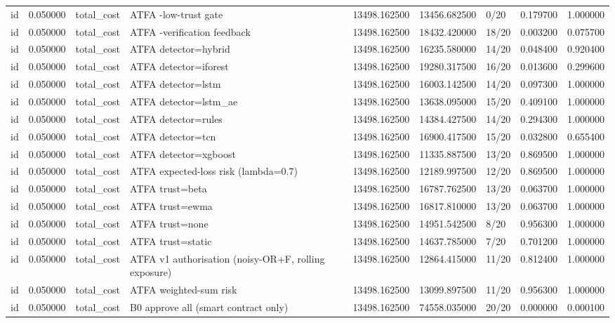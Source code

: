 \begin{tabular}{lrllrrlrr}
id & 0.050000 & total\_cost & ATFA -low-trust gate & 13498.162500 & 13456.682500 & 0/20 & 0.179700 & 1.000000 \\
id & 0.050000 & total\_cost & ATFA -verification feedback & 13498.162500 & 18432.420000 & 18/20 & 0.003200 & 0.075700 \\
id & 0.050000 & total\_cost & ATFA detector=hybrid & 13498.162500 & 16235.580000 & 14/20 & 0.048400 & 0.920400 \\
id & 0.050000 & total\_cost & ATFA detector=iforest & 13498.162500 & 19280.317500 & 16/20 & 0.013600 & 0.299600 \\
id & 0.050000 & total\_cost & ATFA detector=lstm & 13498.162500 & 16003.142500 & 14/20 & 0.097300 & 1.000000 \\
id & 0.050000 & total\_cost & ATFA detector=lstm\_ae & 13498.162500 & 13638.095000 & 15/20 & 0.409100 & 1.000000 \\
id & 0.050000 & total\_cost & ATFA detector=rules & 13498.162500 & 14384.427500 & 14/20 & 0.294300 & 1.000000 \\
id & 0.050000 & total\_cost & ATFA detector=tcn & 13498.162500 & 16900.417500 & 15/20 & 0.032800 & 0.655400 \\
id & 0.050000 & total\_cost & ATFA detector=xgboost & 13498.162500 & 11335.887500 & 13/20 & 0.869500 & 1.000000 \\
id & 0.050000 & total\_cost & ATFA expected-loss risk (lambda=0.7) & 13498.162500 & 12189.997500 & 12/20 & 0.869500 & 1.000000 \\
id & 0.050000 & total\_cost & ATFA trust=beta & 13498.162500 & 16787.762500 & 13/20 & 0.063700 & 1.000000 \\
id & 0.050000 & total\_cost & ATFA trust=ewma & 13498.162500 & 16817.810000 & 13/20 & 0.063700 & 1.000000 \\
id & 0.050000 & total\_cost & ATFA trust=none & 13498.162500 & 14951.542500 & 8/20 & 0.956300 & 1.000000 \\
id & 0.050000 & total\_cost & ATFA trust=static & 13498.162500 & 14637.785000 & 7/20 & 0.701200 & 1.000000 \\
id & 0.050000 & total\_cost & ATFA v1 authorisation (noisy-OR+F, rolling exposure) & 13498.162500 & 12864.415000 & 11/20 & 0.812400 & 1.000000 \\
id & 0.050000 & total\_cost & ATFA weighted-sum risk & 13498.162500 & 13099.897500 & 11/20 & 0.956300 & 1.000000 \\
id & 0.050000 & total\_cost & B0 approve all (smart contract only) & 13498.162500 & 74558.035000 & 20/20 & 0.000000 & 0.000100 \\

\end{tabular}
